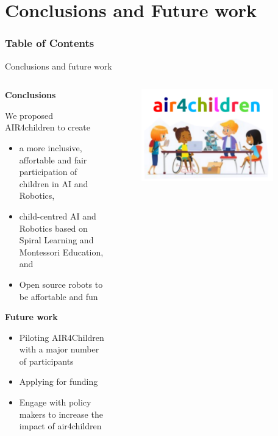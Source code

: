 \section{Conclusions and Future work}


\begin{frame}
      \frametitle{Table of Contents}
      \tableofcontents[currentsection]
\end{frame}



{
\begin{frame}{Conclusions and future work}

  \begin{columns}
  \begin{column}{.75\linewidth}

  \textbf{Conclusions}   

  We proposed AIR4children to create
  \begin{itemize}
    \item a more inclusive, affortable and fair participation of children in AI and Robotics,
    \item child-centred AI and Robotics based on Spiral Learning and Montessori Education, and
    \item Open source robots to be affortable and fun 
  \end{itemize}

  \textbf{Future work}
  \begin{itemize}
    \item Piloting AIR4Children  with a major number of participants 
    \item Applying for funding 
    \item Engage with policy makers to increase the impact of air4children
  \end{itemize}

    \end{column}


  \begin{column}{.3\linewidth}

      \begin{figure}
        \centering
        \includegraphics[width=0.9\textwidth]{./figures/logo/outputs/drawing-v00.png}
      \end{figure}


\end{column}
\end{columns}
\end{frame}}
